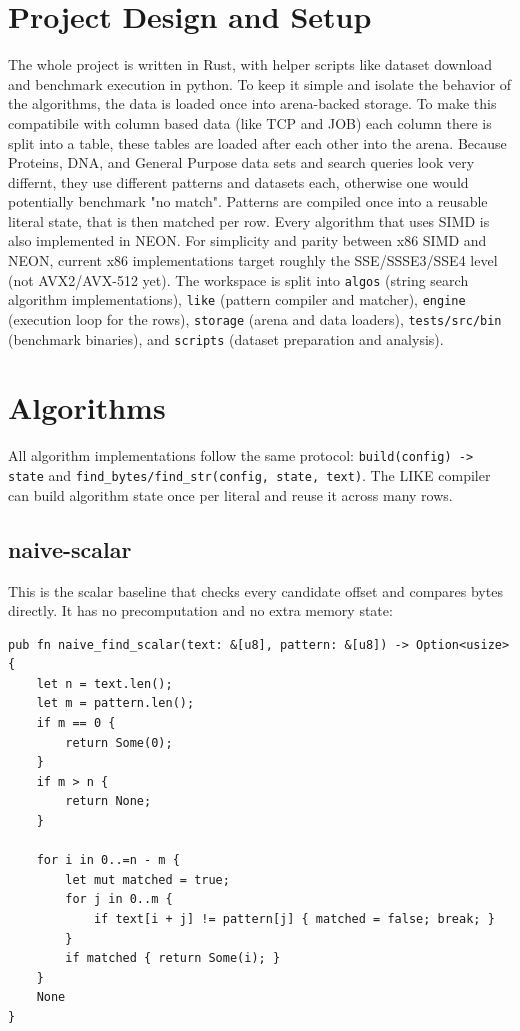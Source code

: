 \documentclass[11pt]{article}
\begin{document}
\section{Project Design and Setup}
The whole project is written in Rust, with helper scripts like dataset download and benchmark execution in python.
To keep it simple and isolate the behavior of the algorithms, the data is loaded once into arena-backed storage.
To make this compatibile with column based data (like TCP and JOB) each column there is split into a table, these tables are loaded after each other into the arena. Because Proteins, DNA, and General Purpose data sets and search queries look very differnt, they use different patterns and datasets each, otherwise one would potentially benchmark "no match".
Patterns are compiled once into a reusable literal state, that is then matched per row. 
Every algorithm that uses SIMD is also implemented in NEON. For simplicity and parity between x86 SIMD and NEON, current x86 implementations target roughly the SSE/SSSE3/SSE4 level (not AVX2/AVX-512 yet).
The workspace is split into \texttt{algos} (string search algorithm implementations), \texttt{like} (pattern compiler and matcher), \texttt{engine} (execution loop for the rows), \texttt{storage} (arena and data loaders), \texttt{tests/src/bin} (benchmark binaries), and \texttt{scripts} (dataset preparation and analysis).

\newpage
\section{Algorithms}
All algorithm implementations follow the same protocol: \texttt{build(config) -> state} and \texttt{find\_bytes/find\_str(config, state, text)}. The LIKE compiler can build algorithm state once per literal and reuse it across many rows.
\newline
\subsection{naive-scalar} 
This is the scalar baseline that checks every candidate offset and compares bytes directly. It has no precomputation and no extra memory state:
\begin{lstlisting}[style=ruststyle]
pub fn naive_find_scalar(text: &[u8], pattern: &[u8]) -> Option<usize> {
    let n = text.len();
    let m = pattern.len();
    if m == 0 {
        return Some(0);
    }
    if m > n {
        return None;
    }

    for i in 0..=n - m {
        let mut matched = true;
        for j in 0..m {
            if text[i + j] != pattern[j] { matched = false; break; }
        }
        if matched { return Some(i); }
    }
    None
}
\end{lstlisting}  
\end{document}
